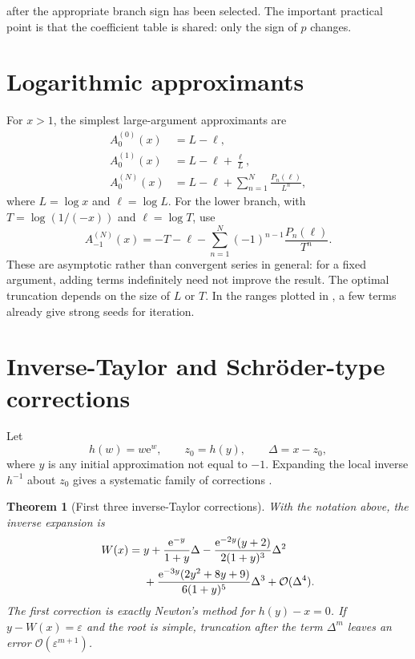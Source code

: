 \documentclass[11pt,openany]{book}
\newcommand{\e}{\mathrm{e}}
\newcommand{\bigO}{\mathcal{O}}
\theoremstyle{plain}
\newtheorem{theorem}{Theorem}[chapter]
\theoremstyle{definition}
\theoremstyle{remark}
\begin{document}
after the appropriate branch sign has been selected.  The important practical
point is that the coefficient table is shared: only the sign of \(p\) changes.

\section{Logarithmic approximants}
For \(x>1\), the simplest large-argument approximants are
\begin{align*}
 A_{0}^{(0)}(x)&=L-\ell,\\
 A_{0}^{(1)}(x)&=L-\ell+\frac\ell L,\\
 A_{0}^{(N)}(x)&=L-\ell+
        \sum_{n=1}^{N}\frac{P_n(\ell)}{L^n},
\end{align*}
where \(L=\log x\) and \(\ell=\log L\).  For the lower branch, with
\(T=\log(1/(-x))\) and \(\ell=\log T\), use
\begin{equation}\label{eq:wm1approximant}
 A_{-1}^{(N)}(x)=-T-\ell-
  \sum_{n=1}^{N}(-1)^{n-1}\frac{P_n(\ell)}{T^n}.
\end{equation}
These are asymptotic rather than convergent series in general: for a fixed
argument, adding terms indefinitely need not improve the result.  The optimal
truncation depends on the size of \(L\) or \(T\).  In the ranges plotted in
, a few terms already give strong
seeds for iteration.

\section{Inverse-Taylor and Schr\"oder-type corrections}\label{sec:schroeder}
Let
\[
       h(w)=w\e^w,
       \qquad z_0=h(y),
       \qquad \Delta=x-z_0,
\]
where \(y\) is any initial approximation not equal to \(-1\).  Expanding the
local inverse \(h^{-1}\) about \(z_0\) gives a systematic family of corrections
\cite{Howard2025}.

\begin{theorem}[First three inverse-Taylor corrections]\label{thm:inversetaylorcorr}
With the notation above, the inverse expansion is
\begin{align}
 W(x)={}&y+\frac{\e^{-y}}{1+y}\Delta
 -\frac{\e^{-2y}(y+2)}{2(1+y)^3}\Delta^2\notag\\
 &+\frac{\e^{-3y}(2y^2+8y+9)}{6(1+y)^5}\Delta^3
 +\bigO(\Delta^4).
\label{eq:schroederseries}
\end{align}
The first correction is exactly Newton's method for \(h(y)-x=0\).
If \(y-W(x)=\varepsilon\) and the root is simple, truncation after the term
\(\Delta^m\) leaves an error \(\bigO(\varepsilon^{m+1})\).
\end{theorem}
\end{document}

